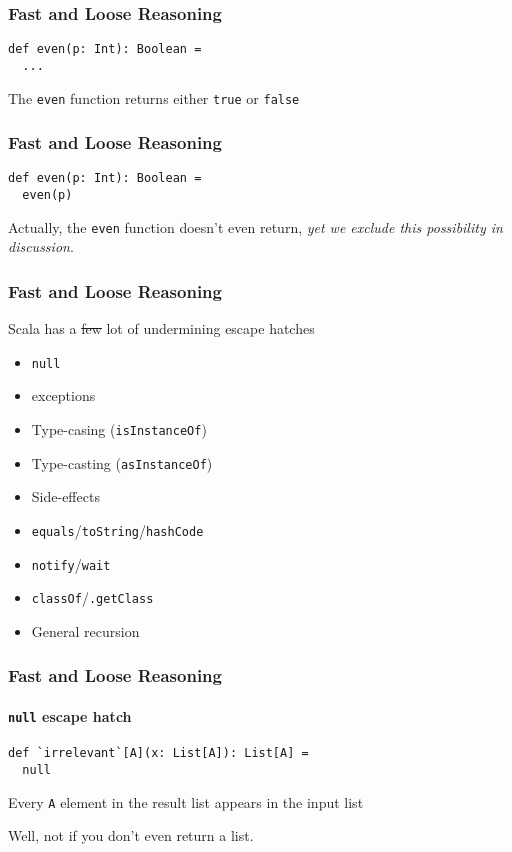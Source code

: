 \begin{frame}[fragile]
\frametitle{Fast and Loose Reasoning}
\begin{lstlisting}[style=scala]
def even(p: Int): Boolean = 
  ...
\end{lstlisting}
\begin{theorem}The \lstinline{even} function returns either \lstinline{true} or \lstinline{false}\end{theorem}
\end{frame}

\begin{frame}[fragile]
\frametitle{Fast and Loose Reasoning}
\begin{lstlisting}[style=scala]
def even(p: Int): Boolean = 
  even(p)
\end{lstlisting}
Actually, the \lstinline{even} function doesn't even return, \emph{yet we
exclude this possibility in discussion}.
\end{frame}

\begin{frame}[fragile]
\frametitle{Fast and Loose Reasoning}
\begin{block}{Scala has a \sout{few} lot of undermining escape hatches}
\begin{itemize}
  \item \lstinline{null}
  \item exceptions
  \item Type-casing (\lstinline{isInstanceOf})
  \item Type-casting (\lstinline{asInstanceOf})
  \item Side-effects
  \item \lstinline{equals}/\lstinline{toString}/\lstinline{hashCode}
  \item \lstinline{notify}/\lstinline{wait}
  \item \lstinline{classOf}/\lstinline{.getClass}
  \item General recursion
\end{itemize}
\end{block}
\end{frame}

\begin{frame}[fragile]
\frametitle{Fast and Loose Reasoning}
\framesubtitle{\lstinline{null} escape hatch}
\begin{lstlisting}[style=scala]
def `irrelevant`[A](x: List[A]): List[A] = 
  null
\end{lstlisting}
\begin{theorem}Every \lstinline{A} element in the result list appears in the input list\end{theorem}
Well, not if you don't even return a list.
\end{frame}


